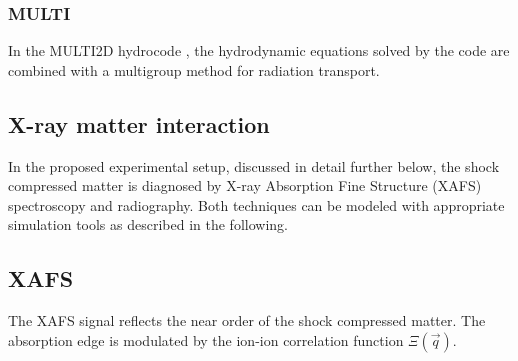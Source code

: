 \documentclass[12pt]{scrartcl}
\begin{document}
\subsubsection{MULTI}
In the MULTI2D hydrocode \cite{Ramis2009},
the hydrodynamic equations solved by the code are combined with a multigroup method for radiation transport.

\subsection{X-ray matter interaction}
In the proposed experimental setup, discussed in detail further below, the shock compressed matter is diagnosed by
X-ray Absorption Fine Structure (XAFS) spectroscopy and radiography. Both techniques can be modeled with appropriate simulation tools as
described in the following.
\subsection{XAFS}
The XAFS signal reflects the near order of the shock compressed matter. The absorption edge is modulated by the ion-ion correlation function
$\Xi(\vec q)$.

\printbibliography
\end{document}
